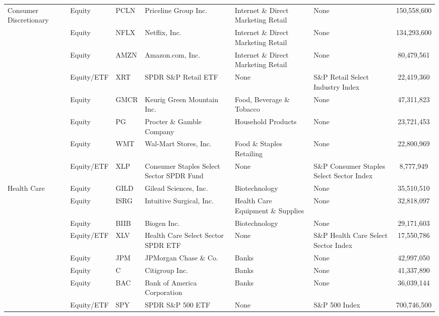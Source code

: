 \documentclass[a4paper,12pt]{article}
\theoremstyle{plain}
\theoremstyle{definition}
\begin{document}
\begin{landscape}
\begin{table}[ht!]
{\begin{tabular}{l l l l l p{5cm} c}
\hline 
 \multirow{5}{4cm}{Consumer Discretionary} & Equity & PCLN & Priceline Group Inc. & Internet \& Direct Marketing Retail & None & 150,558,600  \\ 
                & Equity         & NFLX  & Netflix, Inc.            & Internet \& Direct Marketing Retail & None & 134,293,600  \\  
                & Equity         & AMZN    & Amazon.com, Inc.      & Internet \& Direct Marketing Retail  & None   & 80,479,561    \\
                & Equity/ETF & XRT  & SPDR S\&P Retail ETF & None & S\&P Retail Select Industry Index & 22,419,360  \\ 
\hline
 \multirow{5}{4cm}{Consumer Staples} & Equity  & GMCR  & Keurig Green Mountain Inc. & Food, Beverage \& Tobacco & None  & 47,311,823  \\ 
                & Equity         & PG  & Procter \& Gamble Company            & Household Products & None & 23,721,453  \\  
                & Equity         & WMT    & Wal-Mart Stores, Inc.     &  Food \& Staples Retailing      & None   & 22,800,969     \\
                & Equity/ETF & XLP  & Consumer Staples Select Sector SPDR Fund & None & S\&P Consumer Staples Select Sector Index & 8,777,949  \\ 
\hline 
 \multirow{5}{*}{Health Care} & Equity        & GILD     & Gilead Sciences, Inc. & Biotechnology & None  & 35,510,510  \\ 
                     & Equity         & ISRG  & Intuitive Surgical, Inc.   & Health Care Equipment \& Supplies & None & 32,818,097  \\  
                     & Equity         & BIIB    & Biogen Inc.     & Biotechnology             & None   & 29,171,603     \\
                     & Equity/ETF & XLV  & Health Care Select Sector SPDR ETF & None & S\&P Health Care Select Sector Index & 17,550,786  \\ 
\hline 
 \multirow{5}{*}{Financials} & Equity        & JPM & JPMorgan Chase \& Co. & Banks  & None  & 42,997,050  \\ 
                  & Equity         & C     & Citigroup Inc.           &  Banks & None & 41,337,890  \\  
                  & Equity         &  BAC  & Bank of America Corporation     &  Banks               & None   & 36,039,144     \\
                  & Equity/ETF & SPY  & SPDR S\&P 500 ETF & None & S\&P 500 Index & 700,746,500  \\ 

\end{tabular}}
\end{table}
\end{landscape}
\end{document}

